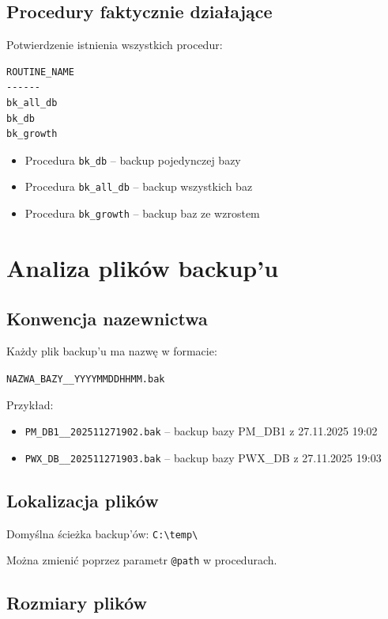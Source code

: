 \documentclass[a4paper,11pt]{article}
\begin{document}
	\subsection{Procedury faktycznie działające}
	
	Potwierdzenie istnienia wszystkich procedur:
	
	\begin{lstlisting}
ROUTINE_NAME
------
bk_all_db
bk_db
bk_growth
	\end{lstlisting}
	
	\begin{itemize}
		\item Procedura \texttt{bk\_db} -- backup pojedynczej bazy
		\item Procedura \texttt{bk\_all\_db} -- backup wszystkich baz
		\item Procedura \texttt{bk\_growth} -- backup baz ze wzrostem
	\end{itemize}
	
	\section{Analiza plików backup'u}
	
	\subsection{Konwencja nazewnictwa}
	
	Każdy plik backup'u ma nazwę w formacie:
	\begin{center}
		\texttt{NAZWA\_BAZY\_\_YYYYMMDDHHMM.bak}
	\end{center}
	
	Przykład:
	\begin{itemize}
		\item \texttt{PM\_DB1\_\_202511271902.bak} -- backup bazy PM\_DB1 z 27.11.2025 19:02
		\item \texttt{PWX\_DB\_\_202511271903.bak} -- backup bazy PWX\_DB z 27.11.2025 19:03
	\end{itemize}
	
	\subsection{Lokalizacja plików}
	
	Domyślna ścieżka backup'ów: \texttt{C:\textbackslash temp\textbackslash}
	
	Można zmienić poprzez parametr \texttt{@path} w procedurach.
	
	\subsection{Rozmiary plików}
	
\end{document}
